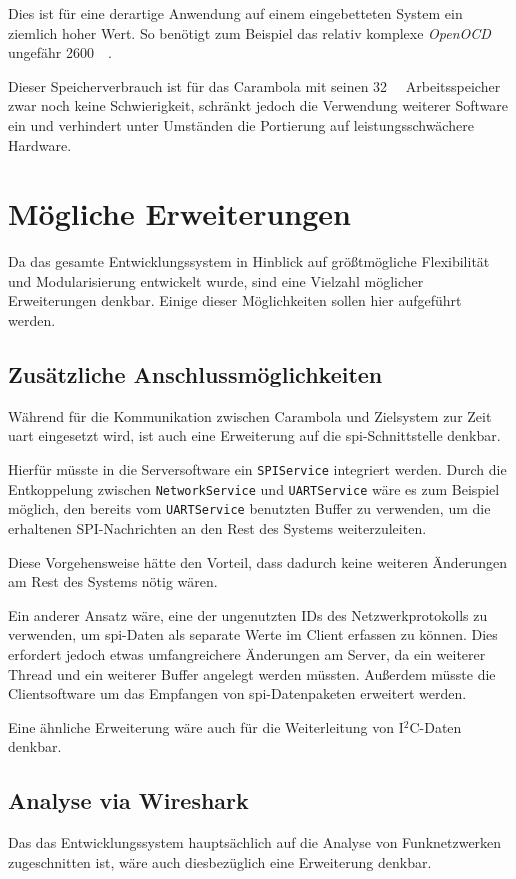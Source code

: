Dies ist für eine derartige Anwendung auf einem eingebetteten System ein
ziemlich hoher Wert. So benötigt zum Beispiel das relativ komplexe
\emph{OpenOCD} ungefähr \SI{2600}{\kilo\byte}.

Dieser Speicherverbrauch ist für das Carambola mit seinen \SI{32}{\mega\byte}
Arbeitsspeicher zwar noch keine Schwierigkeit, schränkt jedoch die Verwendung
weiterer Software ein und verhindert unter Umständen die Portierung auf
leistungsschwächere Hardware.
\section{Mögliche Erweiterungen}
Da das gesamte Entwicklungssystem in Hinblick auf größtmögliche Flexibilität und
Modularisierung entwickelt wurde, sind eine Vielzahl möglicher Erweiterungen
denkbar. Einige dieser Möglichkeiten sollen hier aufgeführt werden.
\subsection{Zusätzliche Anschlussmöglichkeiten}
Während für die Kommunikation zwischen Carambola und Zielsystem zur Zeit
\gls{uart} eingesetzt wird, ist auch eine Erweiterung auf die
\gls{spi}-Schnittstelle denkbar.

Hierfür müsste in die Serversoftware ein \texttt{SPIService} integriert werden.
Durch die Entkoppelung zwischen \texttt{NetworkService} und
\texttt{UARTService} wäre es zum Beispiel möglich, den bereits vom
\texttt{UARTService} benutzten Buffer zu verwenden, um die erhaltenen
SPI-Nachrichten an den Rest des Systems weiterzuleiten.

Diese Vorgehensweise hätte den Vorteil, dass dadurch keine weiteren
Änderungen am Rest des Systems nötig wären.

Ein anderer Ansatz wäre, eine der ungenutzten IDs des Netzwerkprotokolls zu
verwenden, um \gls{spi}-Daten als separate Werte im Client erfassen zu
können. Dies erfordert jedoch etwas umfangreichere Änderungen am Server, da ein
weiterer Thread und ein weiterer Buffer angelegt werden müssten. Außerdem müsste
die Clientsoftware um das Empfangen von \gls{spi}-Datenpaketen erweitert werden.

Eine ähnliche Erweiterung wäre auch für die Weiterleitung von I$^2$C-Daten
denkbar.
\subsection{Analyse via Wireshark}
Das das Entwicklungssystem hauptsächlich auf die Analyse von Funknetzwerken
zugeschnitten ist, wäre auch diesbezüglich eine Erweiterung denkbar.

